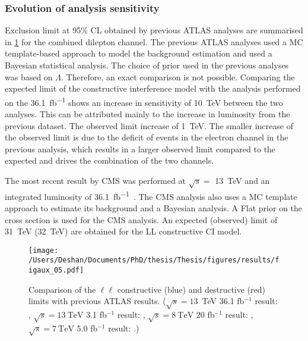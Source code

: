 \subsubsection{Evolution of analysis sensitivity}\label{sec:results:evol}
Exclusion limit at 95\% CL obtained by previous ATLAS analyses are summarised in \cref{fig:limit_evol} for the combined dilepton channel. The previous ATLAS analyses used a MC template-based approach to model the background estimation and used a Bayesian statistical analysis. The choice of prior used in the previous analyses was based on $\Lambda$. Therefore, an exact comparison is not possible. Comparing the expected limit of the constructive interference model with the analysis performed on the \SI{36.1}{\femto\barn^{-1}} shows an increase in sensitivity of \SI{10}{\tera\electronvolt} between the two analyses. This can be attributed mainly to the increase in luminosity from the previous dataset. The observed limit increase of \SI{1}{\tera\electronvolt}. The smaller increase of the observed limit is due to the deficit of events in the electron channel in the previous analysis, which results in a larger observed limit compared to the expected and drives the combination of the two channels.

The most recent result by CMS was performed at $\sqrt{s} = $ \SI{13}{\tera\electronvolt} and an integrated luminosity of \SI{36.1}{\femto\barn^{-1}}~\cite{Sirunyan:2018ipj}. The CMS analysis also uses a MC template approach to estimate its background and a Bayesian analysis. A Flat prior on the cross section is used for the CMS analysis. An expected (observed) limit of \SI{31}{\tera\electronvolt} (\SI{32}{\tera\electronvolt}) are obtained for the LL constructive CI model. 

\begin{figure}[!htpb]
    \centering
    \texttt{[image: /Users/Deshan/Documents/PhD/thesis/Thesis/figures/results/figaux\_05.pdf]}
    \caption[Comparison of the $\ell\ell$ constructive (blue) and destructive (red) limits with previous ATLAS results.]{Comparison of the $\ell\ell$ constructive (blue) and destructive (red) limits with previous ATLAS results. ($\sqrt{s}=13$~TeV 36.1 fb$^{-1}$ result: \cite{EXOT-2016-05}, $\sqrt{s}=\SI{13}{\tera\electronvolt}$ 3.1 fb$^{-1}$ result: \cite{EXOT-2015-07}, $\sqrt{s}=\SI{8}{\tera\electronvolt}$ 20 fb$^{-1}$ result: \cite{EXOT-2013-19}, $\sqrt{s}=\SI{7}{\tera\electronvolt}$ 5.0 fb$^{-1}$ result: \cite{EXOT-2012-17}.)}
    \label{fig:limit_evol}
\end{figure}